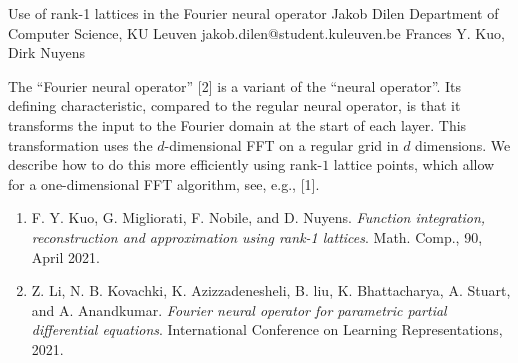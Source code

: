 \begin{talk}
  {Use of rank-1 lattices in the Fourier neural operator}%
  {Jakob Dilen}%
  {Department of Computer Science, KU Leuven}%
  {jakob.dilen@student.kuleuven.be}%
  {Frances Y. Kuo, Dirk Nuyens}%
  
    

The ``Fourier neural operator'' [2] is a variant of the ``neural operator''.
Its defining characteristic, compared to the regular neural operator, is that it transforms the input to the Fourier domain at the start of each layer. This transformation uses the $d$-dimensional FFT on a regular grid in $d$ dimensions. We describe how to do this more efficiently using rank-$1$ lattice points, which allow for a one-dimensional FFT algorithm, see, e.g., [1]. 

\medskip
\begin{enumerate}
        \item[{[1]}] F. Y. Kuo, G. Migliorati, F. Nobile, and D. Nuyens. \textit{Function integration,
reconstruction and approximation using rank-1 lattices}. Math. Comp., 90, April
2021.   
        \item[{[2]}] Z. Li, N. B. Kovachki, K. Azizzadenesheli, B. liu, K. Bhattacharya, A. Stuart,
and A. Anandkumar. \textit{Fourier neural operator for parametric partial differential
equations}. International Conference on Learning Representations, 2021.
\end{enumerate}
\end{talk}

